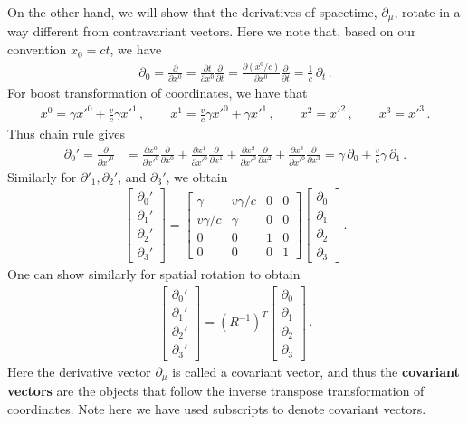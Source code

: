 \documentclass[11pt, onesided]{book}
\theoremstyle{break}
\theoremstyle{break}
\newcommand{\pd}{\partial}
\newcommand{\bmat}[1]{\begin{bmatrix} #1 \end{bmatrix}}
\begin{document}
On the other hand, we will show that the derivatives of spacetime, $\pd_\mu$, rotate in a way different from contravariant vectors. Here we note that, based on our convention $x_0 = ct$, we have
\begin{align*}
\pd_0 = \frac{\pd}{\pd x^0} = \frac{\pd t}{\pd x^0} \frac{\pd}{\pd t} = \frac{\pd (x^0/c)}{\pd x^0} \frac{\pd}{\pd t} = \frac{1}{c}\, \pd_t\,.
\end{align*}
For boost transformation of coordinates, we have that
\begin{align*}
x^0 = \gamma x'^0 + \frac{v}{c}\gamma x'^1\,,\qquad 
x^1 = \frac{v}{c}\gamma x'^0 + \gamma x'^1\,,\qquad
x^2 = x'^2 \,,\qquad
x^3 = x'^3\,.
\end{align*}
Thus chain rule gives
\begin{align*}
\pd_0' = \frac{\pd}{\pd x'^0} 
&= \frac{\pd x^0}{\pd x'^0} \frac{\pd}{\pd x^0}
+\frac{\pd x^1}{\pd x'^0} \frac{\pd}{\pd x^1}
+\frac{\pd x^2}{\pd x'^0} \frac{\pd}{\pd x^2}
+\frac{\pd x^3}{\pd x'^0} \frac{\pd}{\pd x^3}=\gamma\,\pd_0 + \frac{v}{c}\gamma \, \pd_1 \,.
\end{align*}
Similarly for $\pd'_1, \pd_2'$, and $\pd_3'$, we obtain
\begin{align*}
\bmat{\pd_0'\\
\pd_1'\\
\pd_2'\\
\pd_3'} = 
\bmat{\gamma & v\gamma/c & 0 & 0\\
v\gamma/c & \gamma &0 &0\\
0 &0 &1 &0\\
0 & 0&0 & 1}
\bmat{\pd_0\\
\pd_1\\
\pd_2\\
\pd_3}\,.
\end{align*}
One can show similarly for spatial rotation to obtain
\begin{align*}
\bmat{\pd_0'\\
\pd_1'\\
\pd_2'\\
\pd_3'} = 
(R^{-1})^T 
\bmat{\pd_0\\
\pd_1\\
\pd_2\\
\pd_3}\,.
\end{align*}
Here the derivative vector $\pd_\mu$ is called a covariant vector, and thus the \textbf{covariant vectors} are the objects that follow the inverse transpose transformation of coordinates. Note here we have used subscripts to denote covariant vectors.\\
\end{document}
